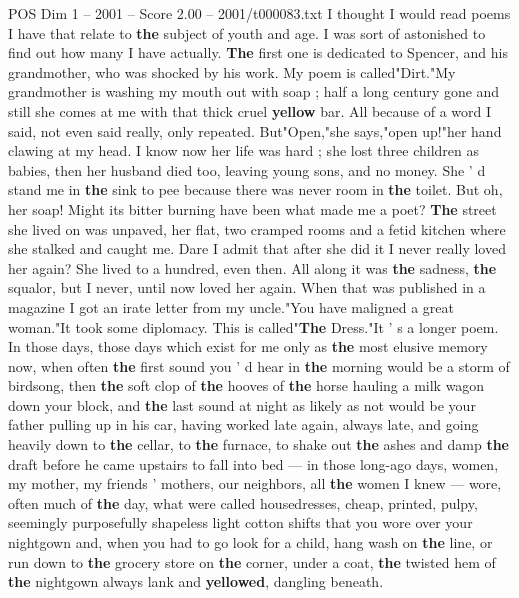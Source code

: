 \begin{textsample}{POS Dim 1 – 2001 – Score 2.00 – 2001/t000083.txt}  \label{ex:f1_pos_076}
I thought I would read poems I have that relate to \textbf{the} subject of youth and age.
I was sort of astonished to find out how many I have actually. \textbf{The} first one is dedicated to Spencer, and his grandmother, who was shocked by his work.
My poem is called"Dirt."My grandmother is washing my mouth out with soap ; half a long century gone and still she comes at me with that thick cruel \textbf{yellow} bar.
All because of a word I said, not even said really, only repeated.
But"Open,"she says,"open up!"her hand clawing at my head.
I know now her life was hard ; she lost three children as babies, then her husband died too, leaving young sons, and no money.
She ' d stand me in \textbf{the} sink to pee because there was never room in \textbf{the} toilet.
But oh, her soap!
Might its bitter burning have been what made me a poet? \textbf{The} street she lived on was unpaved, her flat, two cramped rooms and a fetid kitchen where she stalked and caught me.
Dare I admit that after she did it I never really loved her again?
She lived to a hundred, even then.
All along it was \textbf{the} sadness, \textbf{the} squalor, but I never, until now loved her again.
When that was published in a magazine I got an irate letter from my uncle."You have maligned a great woman."It took some diplomacy.
This is called"\textbf{The} Dress."It ' s a longer poem.
In those days, those days which exist for me only as \textbf{the} most elusive memory now, when often \textbf{the} first sound you ' d hear in \textbf{the} morning would be a storm of birdsong, then \textbf{the} soft clop of \textbf{the} hooves of \textbf{the} horse hauling a milk wagon down your block, and \textbf{the} last sound at night as likely as not would be your father pulling up in his car, having worked late again, always late, and going heavily down to \textbf{the} cellar, to \textbf{the} furnace, to shake out \textbf{the} ashes and damp \textbf{the} draft before he came upstairs to fall into bed — in those long-ago days, women, my mother, my friends ' mothers, our neighbors, all \textbf{the} women I knew — wore, often much of \textbf{the} day, what were called housedresses, cheap, printed, pulpy, seemingly purposefully shapeless light cotton shifts that you wore over your nightgown and, when you had to go look for a child, hang wash on \textbf{the} line, or run down to \textbf{the} grocery store on \textbf{the} corner, under a coat, \textbf{the} twisted hem of \textbf{the} nightgown always lank and \textbf{yellowed}, dangling beneath.

\end{textsample}
